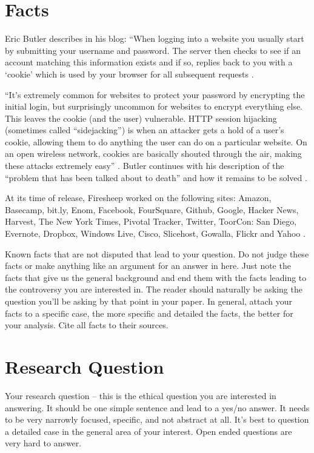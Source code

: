 \documentclass[12pt]{article}
\begin{document}
\section{Facts}
Eric Butler describes in his blog: ``When logging into a website you usually start by submitting your username and password. The server then checks to see if an account matching this information exists and if so, replies back to you with a `cookie' which is used by your browser for all subsequent requests \cite{eric-butler}.

``It's extremely common for websites to protect your password by encrypting the initial login, but surprisingly uncommon for websites to encrypt everything else. This leaves the cookie (and the user) vulnerable. HTTP session hijacking (sometimes called ``sidejacking'') is when an attacker gets a hold of a user's cookie, allowing them to do anything the user can do on a particular website. On an open wireless network, cookies are basically shouted through the air, making these attacks extremely easy'' \cite{eric-butler}. Butler continues with his description of the ``problem that has been talked about to death'' and how it remains to be solved \cite{eric-butler}. 

At its time of release, Firesheep worked on the following sites: Amazon, Basecamp, bit.ly, Enom, Facebook, FourSquare, Github, Google, Hacker News, Harvest, The New York Times, Pivotal Tracker, Twitter, ToorCon: San Diego, Evernote, Dropbox, Windows Live, Cisco, Slicehost, Gowalla, Flickr and Yahoo \cite{firesheep-source}.





Known facts that are not disputed that lead to your question. Do not judge these facts or make anything like an argument for an answer in here. Just note the facts that give us the general background and end them with the facts leading to the controversy you are interested in. The reader should naturally be asking the question you'll be asking by that point in your paper. In general, attach your facts to a specific case, the more specific and detailed the facts, the better for your analysis. Cite all facts to their sources. \cite{handout}

\section{Research Question}
Your research question -- this is the ethical question you are interested in answering. It should be one simple sentence and lead to a yes/no answer. It needs to be very narrowly focused, specific, and not abstract at all. It's best to question a detailed case in the general area of your interest. Open ended questions are very hard to answer. \cite{handout}
\end{document}
